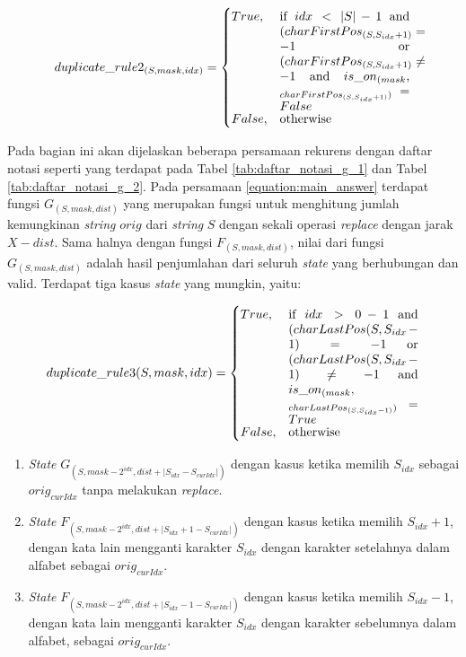 \begin{equation}
duplicate\_rule2_{(S, mask, idx)} = 
\begin{cases}
True, & \parbox[t]{.3\textwidth}{if $idx < |S| -1$
	and ($charFirstPos_{(S, S_{idx} + 1)} = -1$
	or ($charFirstPos_{(S, S_{idx} + 1)} \neq -1$ 
	and $is\_on_{(mask}$, $_{charFirstPos_{(S, S_{idx} + 1)})} = False$}\\
False, & \text{otherwise}
\end{cases}
\label{equation:rekurens_duplicate_rule2}
\end{equation}

Pada bagian ini akan dijelaskan beberapa persamaan rekurens dengan daftar notasi seperti yang terdapat pada Tabel \ref{tab:daftar_notasi_g_1} dan Tabel \ref{tab:daftar_notasi_g_2}. Pada persamaan \ref{equation:main_answer} terdapat fungsi $G_{(S, mask, dist)}$ yang merupakan fungsi untuk menghitung jumlah kemungkinan \textit{string} $orig$ dari \textit{string} $S$ dengan sekali operasi \textit{replace} dengan jarak $X-dist$. Sama halnya dengan fungsi $F_{(S, mask, dist)}$, nilai dari fungsi $G_{(S, mask, dist)}$ adalah hasil penjumlahan dari seluruh \textit{state} yang berhubungan dan valid. Terdapat tiga kasus \textit{state} yang mungkin, yaitu:

\begin{equation}
duplicate\_rule3(S, mask, idx) = 
\begin{cases}
True, & \parbox[t]{.3\textwidth}{if $idx > 0 -1$
	and ($charLastPos(S, S_{idx} - 1) = -1$
	or ($charLastPos(S, S_{idx} - 1) \neq -1$ 
	and $is\_on_{(mask}$, $_{charLastPos_{(S, S_{idx} - 1)})}=True$}\\
False, & \text{otherwise}
\end{cases}
\label{equation:rekurens_duplicate_rule3}
\end{equation}


\begin{enumerate}
	\item \textit{State} $ G_{(S, mask-2^{idx}, dist+|S_{idx}-S_{curIdx}|)} $ dengan kasus ketika memilih $ S_{idx} $ sebagai $ orig_{curIdx} $ tanpa melakukan \textit{replace}.
	\item \textit{State} $ F_{(S, mask-2^{idx}, dist+|S_{idx}+1-S_{curIdx}|)} $ dengan kasus ketika memilih $ S_{idx}+1 $, dengan kata lain mengganti karakter $ S_{idx} $ dengan karakter setelahnya dalam alfabet sebagai $ orig_{curIdx} $.
	\item \textit{State} $ F_{(S, mask-2^{idx}, dist+|S_{idx}-1-S_{curIdx}|)} $ dengan kasus ketika memilih $ S_{idx}-1 $, dengan kata lain mengganti karakter $ S_{idx} $ dengan karakter sebelumnya dalam alfabet, sebagai $ orig_{curIdx} $.
\end{enumerate}


